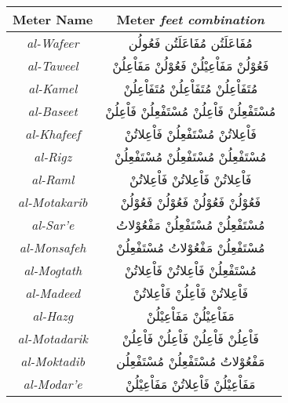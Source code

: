 \documentclass[12pt]{report}
\begin{document}
\begin{center}
  \begin{tabular}[h!]{|c|c|} 
    \hline
    \textbf{Meter Name} & \textbf{Meter} \small{\textit{feet combination}} \\ 
    \hline
   \textit{al-Wafeer}    & \textarabic{مُفَاعَلَتُن مُفَاعَلَتُن فَعُولُن} \\ %
   \textit{al-Taweel}    & \textarabic{فَعُوْلُنْ مَفَاْعِيْلُنْ فَعُوْلُنْ مَفَاْعِلُنْ} \\ %
   \textit{al-Kamel}     & \textarabic{مُتَفَاْعِلُنْ مُتَفَاْعِلُنْ مُتَفَاْعِلُنْ} \\%
   \textit{al-Baseet}    & \textarabic{مُسْتَفْعِلُنْ فَاْعِلُنْ مُسْتَفْعِلُنْ فَاْعِلُنْ} \\%
   \textit{al-Khafeef}   & \textarabic{فَاْعِلاتُنْ مُسْتَفْعِلُنْ فَاْعِلاتُنْ} \\ %
   \textit{al-Rigz}      & \textarabic{مُسْتَفْعِلُنْ مُسْتَفْعِلُنْ مُسْتَفْعِلُنْ} \\%
   \textit{al-Raml}      & \textarabic{فَاْعِلاتُنْ فَاْعِلاتُنْ فَاْعِلاتُنْ} \\ %
   \textit{al-Motakarib} & \textarabic{فَعُوْلُنْ فَعُوْلُنْ فَعُوْلُنْ فَعُوْلُنْ} \\%
   \textit{al-Sar'e}     & \textarabic{مُسْتَفْعِلُنْ مُسْتَفْعِلُنْ مَفْعُوْلاتُ} \\%
   \textit{al-Monsafeh}  & \textarabic{مُسْتَفْعِلُنْ مَفْعُوْلاتُ مُسْتَفْعِلُنْ} \\
   \textit{al-Mogtath}   & \textarabic{مُسْتَفْعِلُنْ فَاْعِلاتُنْ فَاْعِلاتُنْ} \\
   \textit{al-Madeed}    & \textarabic{فَاْعِلاتُنْ فَاْعِلُنْ فَاْعِلاتُنْ } \\
   \textit{al-Hazg}      & \textarabic{مَفَاْعِيْلُنْ مَفَاْعِيْلُنْ} \\%
   \textit{al-Motadarik} & \textarabic{فَاْعِلُنْ فَاْعِلُنْ فَاْعِلُنْ فَاْعِلُنْ} \\%
   \textit{al-Moktadib}  & \textarabic{مَفْعُوْلاتُ مُسْتَفْعِلُنْ مُسْتَفْعِلُن} \\
   \textit{al-Modar'e}   & \textarabic{مَفَاْعِيْلُنْ فَاْعِلاتُنْ مَفَاْعِيْلُنْ} \\
    \hline
  \end{tabular}
  \label{arud:meters}
\end{center}
\end{document}
